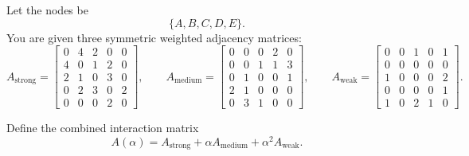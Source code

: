 \documentclass[]{exam}
\numberwithin{equation}{section}
\begin{document}
\begin{questions}
Let the nodes be
\[
\{A,B,C,D,E\}.
\]
You are given three symmetric weighted adjacency matrices:
\[
A_{\text{strong}}=
\begin{bmatrix}
0 & 4 & 2 & 0 & 0\\
4 & 0 & 1 & 2 & 0\\
2 & 1 & 0 & 3 & 0\\
0 & 2 & 3 & 0 & 2\\
0 & 0 & 0 & 2 & 0
\end{bmatrix},
\qquad
A_{\text{medium}}=
\begin{bmatrix}
0 & 0 & 0 & 2 & 0\\
0 & 0 & 1 & 1 & 3\\
0 & 1 & 0 & 0 & 1\\
2 & 1 & 0 & 0 & 0\\
0 & 3 & 1 & 0 & 0
\end{bmatrix},
\qquad
A_{\text{weak}}=
\begin{bmatrix}
0 & 0 & 1 & 0 & 1\\
0 & 0 & 0 & 0 & 0\\
1 & 0 & 0 & 0 & 2\\
0 & 0 & 0 & 0 & 1\\
1 & 0 & 2 & 1 & 0
\end{bmatrix}.
\]

Define the combined interaction matrix
\[
A(\alpha)=A_{\text{strong}}+\alpha A_{\text{medium}}+\alpha^2 A_{\text{weak}}.
\]

\end{questions}
\end{document}
